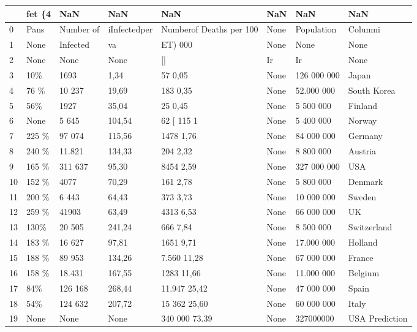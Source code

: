 \begin{tabular}{llllllll}
\toprule
{} & fet \{4 &        NaN &           NaN &                      NaN &   NaN &          NaN &             NaN \\
\midrule
0  &   Pans &  Number of &  iInfectedper &  Numberof Deaths per 100 &  None &   Population &         Columni \\
1  &   None &   Infected &            va &                  ET) 000 &  None &         None &            None \\
2  &   None &       None &          None &                       [| &    Ir &           Ir &            None \\
3  &    10\% &       1693 &          1,34 &                  57 0,05 &  None &  126 000 000 &           Japan \\
4  &   76 \% &     10 237 &         19,69 &                 183 0,35 &  None &   52.000 000 &     South Korea \\
5  &    56\% &       1927 &         35,04 &                  25 0,45 &  None &    5 500 000 &         Finland \\
6  &   None &      5 645 &        104,54 &               62 [ 115 1 &  None &    5 400 000 &          Norway \\
7  &  225 \% &     97 074 &        115,56 &                1478 1,76 &  None &   84 000 000 &         Germany \\
8  &  240 \% &     11.821 &        134,33 &                 204 2,32 &  None &    8 800 000 &         Austria \\
9  &  165 \% &    311 637 &         95,30 &                8454 2,59 &  None &  327 000 000 &             USA \\
10 &  152 \% &       4077 &         70,29 &                 161 2,78 &  None &    5 800 000 &         Denmark \\
11 &  200 \% &      6 443 &         64,43 &                 373 3,73 &  None &   10 000 000 &          Sweden \\
12 &  259 \% &      41903 &         63,49 &                4313 6,53 &  None &   66 000 000 &              UK \\
13 &   130\% &     20 505 &        241,24 &                 666 7,84 &  None &    8 500 000 &     Switzerland \\
14 &  183 \% &     16 627 &         97,81 &                1651 9,71 &  None &   17.000 000 &         Holland \\
15 &  188 \% &     89 953 &        134,26 &              7.560 11,28 &  None &   67 000 000 &          France \\
16 &  158 \% &     18.431 &        167,55 &               1283 11,66 &  None &   11.000 000 &         Belgium \\
17 &    84\% &    126 168 &        268,44 &             11.947 25,42 &  None &   47 000 000 &           Spain \\
18 &    54\% &    124 632 &        207,72 &             15 362 25,60 &  None &   60 000 000 &           Italy \\
19 &   None &       None &          None &            340 000 73.39 &  None &    327000000 &  USA Prediction \\
\bottomrule
\end{tabular}
